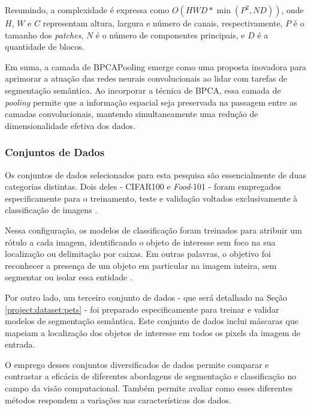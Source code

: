 Resumindo, a complexidade é expressa como $O(HWD * \min(P^2, ND))$, onde $H$, $W$ e $C$ representam altura, largura e número de canais, respectivamente, $P$ é o tamanho dos \textit{patches}, $N$ é o número de componentes principais, e $D$ é a quantidade de blocos.

Em suma, a camada de BPCAPooling emerge como uma proposta inovadora para aprimorar a atuação das redes neurais convolucionais ao lidar com tarefas de segmentação semântica. Ao incorporar a técnica de BPCA, essa camada de \textit{pooling} permite que a informação espacial seja preservada na passagem entre as camadas convolucionais, mantendo simultaneamente uma redução de dimensionalidade efetiva dos dados.%

\subsubsection{Conjuntos de Dados}
\label{project:dataset}
Os conjuntos de dados selecionados para esta pesquisa são essencialmente de duas categorias distintas. Dois deles - CIFAR100 e \textit{Food}-101 - foram empregados especificamente para o treinamento, teste e validação voltados exclusivamente à classificação de imagens \citep{Krizhevsky2009LearningImages, Bossard2014Food-101Forests}.

Nessa configuração, os modelos de classificação foram treinados para atribuir um rótulo a cada imagem, identificando o objeto de interesse sem foco na sua localização ou delimitação por caixas. Em outras palavras, o objetivo foi reconhecer a presença de um objeto em particular na imagem inteira, sem segmentar ou isolar essa entidade \citep{Viitaniemi2008TechniquesSegmentation}.

Por outro lado, um terceiro conjunto de dados - que será detalhado na Seção \ref{project:dataset:pets} - foi preparado especificamente para treinar e validar modelos de segmentação semântica. Este conjunto de dados inclui máscaras que mapeiam a localização dos objetos de interesse em todos os pixels da imagem de entrada.

O emprego desses conjuntos diversificados de dados permite comparar e contrastar a eficácia de diferentes abordagens de segmentação e classificação no campo da visão computacional. Também permite avaliar como esses diferentes métodos respondem a variações nas características dos dados.

